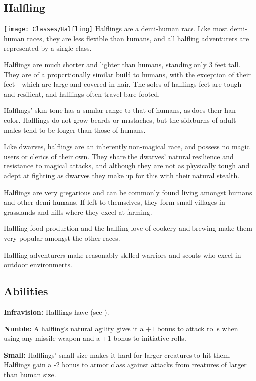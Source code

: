 \begin{multicols*}{2}

\section{Halfling}\label{class:Halfling}
\texttt{[image: Classes/Halfling]}
Halflings are a demi-human race. Like most demi-human races, they are less flexible than humans, and all halfling adventurers are represented by a single class.

Halflings are much shorter and lighter than humans, standing only 3 feet tall. They are of a proportionally similar build to humans, with the exception of their feet—which are large and covered in hair. The soles of halflings feet are tough and resilient, and halflings often travel bare-footed.

Halflings’ skin tone has a similar range to that of humans, as does their hair color. Halflings do not grow beards or mustaches, but the sideburns of adult males tend to be longer than those of humans.

Like dwarves, halflings are an inherently non-magical race, and possess no magic users or clerics of their own. They share the dwarves’ natural resilience and resistance to magical attacks, and although they are not as physically tough and adept at fighting as dwarves they make up for this with their natural stealth.

Halflings are very gregarious and can be commonly found living amongst humans and other demi-humans. If left to themselves, they form small villages in grasslands and hills where they excel at farming.

Halfling food production and the halfling love of cookery and brewing make them very popular amongst the other races.

Halfling adventurers make reasonably skilled warriors and scouts who excel in outdoor environments.

\subsection{Abilities}
\textbf{Infravision:} Halflings have  (see ).

\textbf{Nimble:} A halfling’s natural agility gives it a +1 bonus to attack rolls when using any missile weapon and a +1 bonus to initiative rolls.

\textbf{Small:} Halflings’ small size makes it hard for larger creatures to hit them. Halflings gain a -2 bonus to armor class against attacks from creatures of larger than human size.


\end{multicols*}
